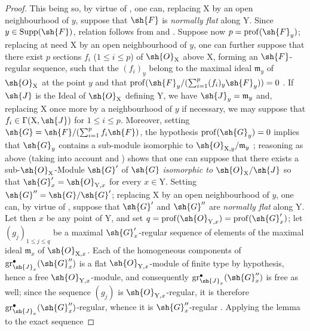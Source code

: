 \begin{proof}
This being so, by virtue of , one can, replacing $\mathrm{X}$ by an open neighbourhood of $y$, suppose that $\sh{F}$ is \emph{normally flat} along $\mathrm{Y}$. Since $y\in\operatorname{Supp}(\sh{F})$, relation  follows from  and . Suppose now $p=\operatorname{prof}(\sh{F}_y)$; replacing at need $\mathrm{X}$ by an open neighbourhood of $y$, one can further suppose that there exist $p$ sections $f_i$ ($1\leqslant i\leqslant p$) of $\sh{O}_\mathrm{X}$ above $\mathrm{X}$, forming an $\sh{F}$-regular sequence, such that the $(f_i)_y$ belong to the maximal ideal $\mathfrak{m}_y$ of $\sh{O}_{\mathrm{X}}$ at the point $y$ and that $\operatorname{prof}(\sh{F}_y/(\sum_{i=1}^p (f_i)_y\sh{F}_y))=0$ . If $\sh{J}$ is the Ideal of $\sh{O}_\mathrm{X}$ defining $\mathrm{Y}$, we have $\sh{J}_y=\mathfrak{m}_y$ and, replacing $\mathrm{X}$ once more by a neighbourhood of $y$ if necessary, we may suppose that $f_i\in\Gamma(\mathrm{X},\sh{J})$ for $1\leqslant i\leqslant p$. Moreover, setting $\sh{G}=\sh{F}/(\sum_{i=1}^p f_i\sh{F})$, the hypothesis $\operatorname{prof}(\sh{G}_y)=0$ implies that $\sh{G}_y$ contains a sub-module isomorphic to $\sh{O}_{\mathrm{X},y}/\mathfrak{m}_y$ ; reasoning as above (taking into account  and ) shows that one can suppose that there exists a sub-$\sh{O}_\mathrm{X}$-Module $\sh{G}'$ of $\sh{G}$ \emph{isomorphic to} $\sh{O}_\mathrm{X}/\sh{J}$ so that $\sh{G}'_x=\sh{O}_{\mathrm{Y},x}$ for every $x\in\mathrm{Y}$. Setting $\sh{G}''=\sh{G}/\sh{G}'$; replacing $\mathrm{X}$ by an open neighbourhood of $y$, one can, by virtue of , suppose that $\sh{G}'$ and $\sh{G}''$ are \emph{normally flat} along $\mathrm{Y}$. Let then $x$ be any point of $\mathrm{Y}$, and set $q=\operatorname{prof}(\sh{O}_{\mathrm{Y},x})=\operatorname{prof}(\sh{G}'_x)$; let $(g_j)_{1\leqslant j\leqslant q}$ be a maximal $\sh{G}'_x$-regular sequence of elements of the maximal ideal $\mathfrak{m}_x$ of $\sh{O}_{\mathrm{X},x}$. Each of the homogeneous components of $\operatorname{gr}^{\bullet}_{\sh{J}_x}(\sh{G}''_x)$ is a flat $\sh{O}_{\mathrm{Y},x}$-module of finite type by hypothesis, hence a free $\sh{O}_{\mathrm{Y},x}$-module, and consequently $\operatorname{gr}^{\bullet}_{\sh{J}_x}(\sh{G}''_x)$ is free as well; since the sequence $(g_j)$ is $\sh{O}_{\mathrm{Y},x}$-regular, it is therefore $\operatorname{gr}^{\bullet}_{\sh{J}_x}(\sh{G}''_x)$-regular, whence it is $\sh{G}''_x$-regular . Applying the lemma  to the exact sequence

\end{proof}
